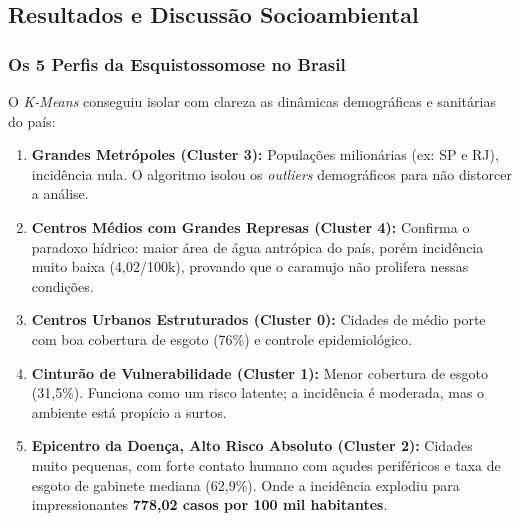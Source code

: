 \documentclass[12pt]{article}
\begin{document}
\subsection{Resultados e Discussão Socioambiental}

\subsubsection{Os 5 Perfis da Esquistossomose no Brasil}
O \textit{K-Means} conseguiu isolar com clareza as dinâmicas demográficas e sanitárias
do país:

\begin{enumerate}
    \item \textbf{Grandes Metrópoles (Cluster 3):} Populações milionárias (ex: SP e RJ),
    incidência nula. O algoritmo isolou os \textit{outliers} demográficos para não
    distorcer a análise.
    \item \textbf{Centros Médios com Grandes Represas (Cluster 4):} Confirma o paradoxo
    hídrico: maior área de água antrópica do país, porém incidência muito baixa
    (4,02/100k), provando que o caramujo não prolifera nessas condições.
    \item \textbf{Centros Urbanos Estruturados (Cluster 0):} Cidades de médio porte com
    boa cobertura de esgoto (76\%) e controle epidemiológico.
    \item \textbf{Cinturão de Vulnerabilidade (Cluster 1):} Menor cobertura de esgoto
    (31,5\%). Funciona como um risco latente; a incidência é moderada, mas o ambiente
    está propício a surtos.
    \item \textbf{Epicentro da Doença, Alto Risco Absoluto (Cluster 2):} Cidades muito
    pequenas, com forte contato humano com açudes periféricos e taxa de esgoto de gabinete
    mediana (62,9\%). Onde a incidência explodiu para impressionantes \textbf{778,02 casos
    por 100 mil habitantes}.
\end{enumerate}
\end{document}
